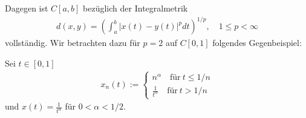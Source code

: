 \documentclass[letterpaper,10pt,english]{jupyterBook}
\begin{document}
Dagegen ist \(C[a,b]\) bezüglich der Integralmetrik
\begin{equation}\label{equation:Funktionalanalysis/GrundlegendeRaeume:eq:LpMetrik}
\begin{split}d(x,y) = \left(\int_a^b |x(t)-y(t)|^p dt \right)^{1/p},\quad 1\le p < \infty\end{split}
\end{equation}
 vollständig. Wir betrachten dazu für \(p=2\) auf \(C[0,1]\) folgendes Gegenbeispiel:

Sei \(t\in[0,1]\)
\begin{equation}\label{equation:Funktionalanalysis/GrundlegendeRaeume:eq:Gegenbeispiel}
\begin{split}x_n(t) := \begin{cases}
n^\alpha\quad\text{für}\ t \le 1/n\\
\frac{1}{t^\alpha}\quad\text{für}\ t > 1/n\end{cases}\end{split}
\end{equation}
und \(x(t) = \frac{1}{t^\alpha}\) für \(0<\alpha<1/2\).

\noindent{}
\end{document}
